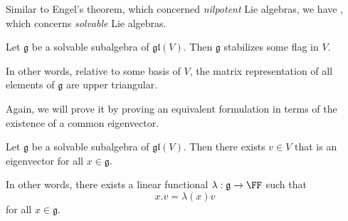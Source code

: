 \documentclass{article}
\newcommand*\frkg{{\ensuremath{\mathfrak{g}}}}
\newcommand*\gl{\ensuremath{\mathfrak{gl}}}
\newcommand*\acts{.}
\begin{document}
Similar to Engel's theorem, which concerned \textit{nilpotent} Lie algebras, we have , which concerns \textit{solvable} Lie algebras.

\begin{theorem}
    Let $\frkg$ be a solvable subalgebra of $\gl(V)$.
    Then $\frkg$ stabilizes some flag in $V$.
\end{theorem}

In other words, relative to some basis of $V$, the matrix representation of all elements of $\frkg$ are upper triangular.

Again, we will prove it by proving an equivalent formulation in terms of the existence of a common eigenvector.

\begin{theorem}
    \label{thm:SolvableAlgebraHasCommonEigenvector}
    Let $\frkg$ be a solvable subalgebra of $\gl(V)$.
    Then there exists $v \in V$ that is an eigenvector for all $x \in \frkg$.

    In other words, there exists a linear functional $\lambda: \frkg \to \FF$ such that 
    \[
        x \acts v
        =
        \lambda(x)v
    \]
    for all $x \in \frkg$.
\end{theorem}
\end{document}
